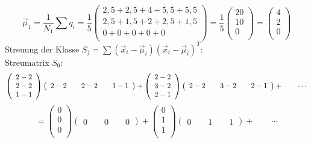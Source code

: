 \[
\vec{\mu}_1 = \frac{1}{N_1} \sum{q_i} = \frac{1}{5}
\left(
\begin {array} {c}
2,5 + 2,5 + 4 + 5,5 + 5,5 \\
2,5 + 1,5 + 2 + 2,5 + 1,5 \\
0 + 0 + 0 + 0 + 0 \\
\end{array}
\right)
= \frac{1}{5}
\left(
\begin {array} {c}
20 \\
10 \\
0 \\
\end {array}
\right)
=
\left(
\begin {array} {c}
4 \\
2 \\
0 \\
\end {array}
\right)
\]
Streuung der Klasse $S_j = \sum{(\vec{x}_i - \vec{\mu}_i)(\vec{x}_i - \vec{\mu}_i)^T}$: \\
Streumatrix $S_0$:
\[ 
\left(
\begin {array} {c}
2 - 2 \\
2 - 2 \\
1 - 1 \\
\end {array}
\right)
\left(
\begin {array} {c}
2 - 2 \qquad 2 - 2 \qquad 1 - 1 
\end {array}
\right) 
+
\left(
\begin {array} {c}
2 - 2 \\
3 - 2 \\
2 - 1 \\
\end {array}
\right)
\left(
\begin {array} {c}
2 - 2 \qquad 3 - 2 \qquad 2 - 1 
\end {array}
\right)
+ \qquad \cdots \\ 
\]
\[
= 
\left(
\begin {array} {c}
0 \\
0 \\
0 \\
\end {array}
\right)
\left(
\begin {array} {c}
0 \qquad 0 \qquad 0 
\end {array}
\right) 
+
\left(
\begin {array} {c}
0 \\
1 \\
1 \\
\end {array}
\right)
\left(
\begin {array} {c}
0 \qquad 1 \qquad 1 
\end {array}
\right)
+ \qquad \cdots
\]
